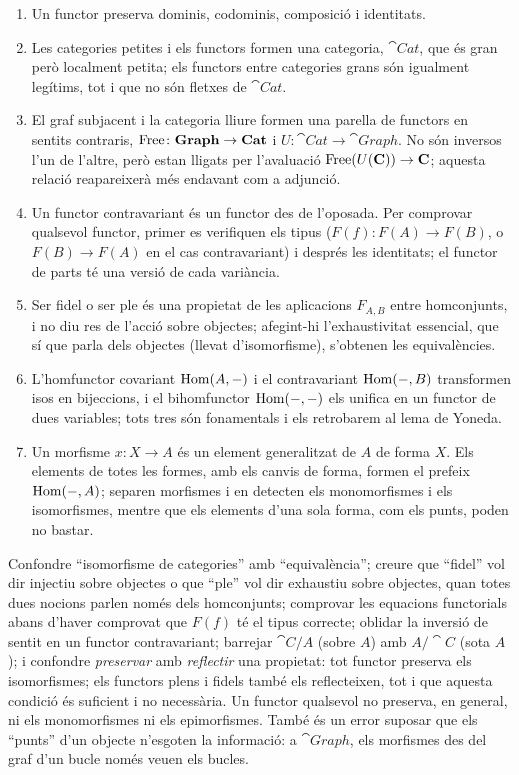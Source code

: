 \begin{resumcap}
\begin{enumerate}
  \item Un functor preserva dominis, codominis, composició i identitats.
  \item Les categories petites i els functors formen una categoria, $\cat{Cat}$, que és gran però localment petita; els functors entre categories grans són igualment legítims, tot i que no són fletxes de $\cat{Cat}$.
  \item El graf subjacent i la categoria lliure formen una parella de functors en sentits contraris, $\operatorname{Free}\colon\mathbf{Graph}\to\mathbf{Cat}$ i $U\colon\cat{Cat}\to\cat{Graph}$. No són inversos l'un de l'altre, però estan lligats per l'avaluació $\operatorname{Free}(U(\mathbf{C}))\to\mathbf{C}$; aquesta relació reapareixerà més endavant com a adjunció.
  \item Un functor contravariant és un functor des de l'oposada. Per comprovar qualsevol functor, primer es verifiquen els tipus ($F(f)\colon F(A)\to F(B)$, o $F(B)\to F(A)$ en el cas contravariant) i després les identitats; el functor de parts té una versió de cada variància.
  \item Ser fidel o ser ple és una propietat de les aplicacions $F_{A,B}$ entre homconjunts, i no diu res de l'acció sobre objectes; afegint-hi l'exhaustivitat essencial, que sí que parla dels objectes (llevat d'isomorfisme), s'obtenen les equivalències.
  \item L'homfunctor covariant $\operatorname{Hom}(A,-)$ i el contravariant $\operatorname{Hom}(-,B)$ transformen isos en bijeccions, i el bihomfunctor $\operatorname{Hom}(-,-)$ els unifica en un functor de dues variables; tots tres són fonamentals i els retrobarem al lema de Yoneda.
  \item Un morfisme $x\colon X\to A$ és un element generalitzat de $A$ de forma $X$. Els elements de totes les formes, amb els canvis de forma, formen el prefeix $\operatorname{Hom}(-,A)$; separen morfismes i en detecten els monomorfismes i els isomorfismes, mentre que els elements d'una sola forma, com els punts, poden no bastar.
\end{enumerate}
 Confondre \enquote{isomorfisme de categories} amb \enquote{equivalència}; creure que \enquote{fidel} vol dir injectiu sobre objectes o que \enquote{ple} vol dir exhaustiu sobre objectes, quan totes dues nocions parlen només dels homconjunts; comprovar les equacions functorials abans d'haver comprovat que $F(f)$ té el tipus correcte; oblidar la inversió de sentit en un functor contravariant; barrejar $\cat{C}/A$ (sobre $A$) amb $A/\cat{C}$ (sota $A$); i confondre \emph{preservar} amb \emph{reflectir} una propietat: tot functor preserva els isomorfismes; els functors plens i fidels també els reflecteixen, tot i que aquesta condició és suficient i no necessària. Un functor qualsevol no preserva, en general, ni els monomorfismes ni els epimorfismes. També és un error suposar que els \enquote{punts} d'un objecte n'esgoten la informació: a $\cat{Graph}$, els morfismes des del graf d'un bucle només veuen els bucles.

\end{resumcap}
